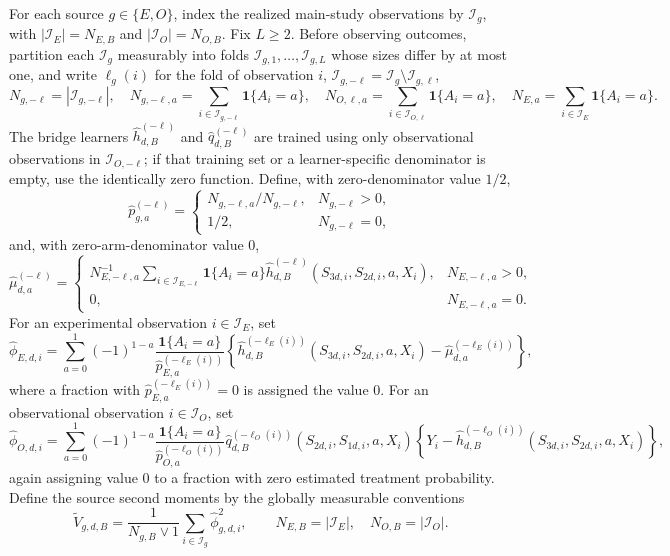 For each source \(g\in\{E,O\}\), index the realized main-study observations by \(\mathcal I_g\), with \(|\mathcal I_E|=N_{E,B}\) and \(|\mathcal I_O|=N_{O,B}\). Fix \(L\ge2\). Before observing outcomes, partition each \(\mathcal I_g\) measurably into folds \(\mathcal I_{g,1},\ldots,\mathcal I_{g,L}\) whose sizes differ by at most one, and write \(\ell_g(i)\) for the fold of observation \(i\), \(\mathcal I_{g,-\ell}=\mathcal I_g\setminus\mathcal I_{g,\ell}\),
\[
 N_{g,-\ell}=|\mathcal I_{g,-\ell}|,
 \quad
 N_{g,-\ell,a}=\sum_{i\in\mathcal I_{g,-\ell}}\mathbf 1\{A_i=a\},
 \quad
 N_{O,\ell,a}=\sum_{i\in\mathcal I_{O,\ell}}\mathbf 1\{A_i=a\},
 \quad
 N_{E,a}=\sum_{i\in\mathcal I_E}\mathbf 1\{A_i=a\}.
\]
The bridge learners \(\widehat h_{d,B}^{(-\ell)}\) and \(\widehat q_{d,B}^{(-\ell)}\) are trained using only observational observations in \(\mathcal I_{O,-\ell}\); if that training set or a learner-specific denominator is empty, use the identically zero function. Define, with zero-denominator value \(1/2\),
\[
 \widehat p_{g,a}^{(-\ell)}
 =\begin{cases}
 N_{g,-\ell,a}/N_{g,-\ell},&N_{g,-\ell}>0,\\
 1/2,&N_{g,-\ell}=0,
 \end{cases}
\]
and, with zero-arm-denominator value \(0\),
\[
 \widehat\mu_{d,a}^{(-\ell)}
 =\begin{cases}
 N_{E,-\ell,a}^{-1}
 \displaystyle\sum_{i\in\mathcal I_{E,-\ell}}
 \mathbf 1\{A_i=a\}
 \widehat h_{d,B}^{(-\ell)}(S_{3d,i},S_{2d,i},a,X_i),
 &N_{E,-\ell,a}>0,\\
 0,&N_{E,-\ell,a}=0.
 \end{cases}
\]
For an experimental observation \(i\in\mathcal I_E\), set
\[
 \widehat\phi_{E,d,i}
 =\sum_{a=0}^1(-1)^{1-a}
 \frac{\mathbf 1\{A_i=a\}}{\widehat p_{E,a}^{(-\ell_E(i))}}
 \left\{
 \widehat h_{d,B}^{(-\ell_E(i))}(S_{3d,i},S_{2d,i},a,X_i)
 -\widehat\mu_{d,a}^{(-\ell_E(i))}
 \right\},
\]
where a fraction with \(\widehat p_{E,a}^{(-\ell_E(i))}=0\) is assigned the value \(0\). For an observational observation \(i\in\mathcal I_O\), set
\[
 \widehat\phi_{O,d,i}
 =\sum_{a=0}^1(-1)^{1-a}
 \frac{\mathbf 1\{A_i=a\}}{\widehat p_{O,a}^{(-\ell_O(i))}}
 \widehat q_{d,B}^{(-\ell_O(i))}(S_{2d,i},S_{1d,i},a,X_i)
 \left\{Y_i-
 \widehat h_{d,B}^{(-\ell_O(i))}(S_{3d,i},S_{2d,i},a,X_i)
 \right\},
\]
again assigning value \(0\) to a fraction with zero estimated treatment probability. Define the source second moments by the globally measurable conventions
\[
 \widetilde V_{g,d,B}
 =\frac{1}{N_{g,B}\vee1}
 \sum_{i\in\mathcal I_g}\widehat\phi_{g,d,i}^2,
 \qquad N_{E,B}=|\mathcal I_E|,
 \quad N_{O,B}=|\mathcal I_O|.
\]
